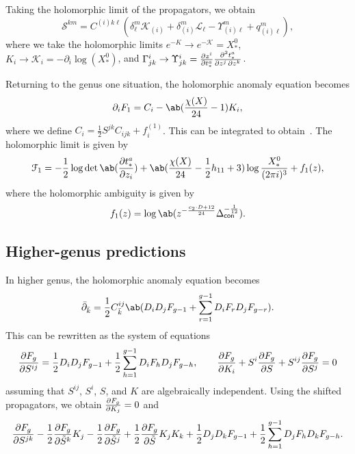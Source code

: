 \documentclass[10pt,oldfontcommands,oneside]{memoir}
\theoremstyle{definition}
\theoremstyle{remark}
\theoremstyle{plain}
\theoremstyle{definition}
\theoremstyle{remark}
\newcommand{\mc}[1]{\mathcal{#1}}
\newcommand{\ms}[1]{\mathsf{#1}}
\newcommand{\1}{\mathbf{1}}
\newcommand{\2}{\mathbf{2}}
\newcommand{\3}{\mathbf{3}}
\begin{document}
Taking the holomorphic limit of the propagators, we obtain
\[ \mc{S}^{km} = C^{(i)k\ell} (\delta_{\ell}^m \mc{K}_{(i)} + \delta_{(i)}^m \mc{L}_{\ell} - \Upsilon_{(i)\ell}^m + q_{(i)\ell}^m), \]
where we take the holomorphic limits
$e^{-K} \to e^{-\mc{K}} = X_*^0$, $K_i \to \mc{K}_i = -\partial_i \log(X_*^0)$, and $\Gamma_{jk}^i \to \Upsilon_{jk}^i = \pdv{z^i}{t_*^a} \pdv{t_*^a}{z^j,z^k}$. 

Returning to the genus one situation, the holomorphic anomaly equation becomes
\[ \partial_i F_1 = C_i - \ab(\frac{\chi(X)}{24}-1)K_i,\]
where we define $C_i = \frac{1}{2}S^{jk} C_{ijk} + f_i^{(1)}$. This can be integrated to obtain~. The holomorphic limit is given by
\[ \mc{F}_1 = -\frac{1}{2}\log \det \ab(\pdv{t_*^a}{z_i}) + \ab(\frac{\chi(X)}{24}- \frac{1}{2} h_{11} + 3)\log \frac{X_*^0}{(2\pi i)^3} + f_1(z), \]
where the holomorphic ambiguity is given by
\[ f_1(z) = \log \ab(z^{-\frac{c_2 \cdot D+12}{24}}\Delta_{\ms{con}}^{-\frac{1}{12}}). \]

\subsection{Higher-genus predictions}%
\label{sub:Higher-genus predictions}

In higher genus, the holomorphic anomaly equation becomes
\[ \bar{\partial}_{\bar{k}} = \frac{1}{2} C_{\bar{k}}^{ij} \ab(D_i D_jF_{g-1} + \sum_{r=1}^{g-1} D_i F_r D_j F_{g-r}). \]
This can be rewritten as the system of equations
\[ \pdv{F_g}{S^{ij}} = \frac{1}{2} D_i D_j F_{g-1} +\frac{1}{2}\sum_{h=1}^{g-1} D_i F_h D_j F_{g-h}, \qquad \pdv{F_g}{K_i} + S^i \pdv{F_g}{S} + S^{ij}\pdv{F_g}{S^j} = 0 \]
assuming that $S^{ij}$, $S^i$, $S$, and $K$ are algebraically independent. Using the shifted propagators, we obtain $\pdv{F_g}{K_j} = 0$ and
\[ \pdv{F_g}{S^{jk}} - \frac{1}{2} \pdv{F_g}{\tilde{S}^k} K_j - \frac{1}{2} \pdv{F_g}{\tilde{S}^j} + \frac{1}{2} \pdv{F_g}{\tilde{S}} K_j K_k + \frac{1}{2} D_j D_k F_{g-1} + \frac{1}{2} \sum_{h=1}^{g-1} D_j F_h D_k F_{g-h}. \]
\end{document}
